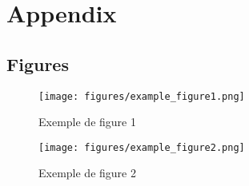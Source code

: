 \documentclass[12pt]{report}
\begin{document}
\newpage
\printbibliography

\newpage
\chapter*{Appendix}

\section{Figures}

\begin{figure}[h]
    \centering
    \texttt{[image: figures/example\_figure1.png]}
    \caption{Exemple de figure 1}
    \label{fig:example1}
\end{figure}

\begin{figure}[h]
    \centering
    \texttt{[image: figures/example\_figure2.png]}
    \caption{Exemple de figure 2}
    \label{fig:example2}
\end{figure}


\end{document}
